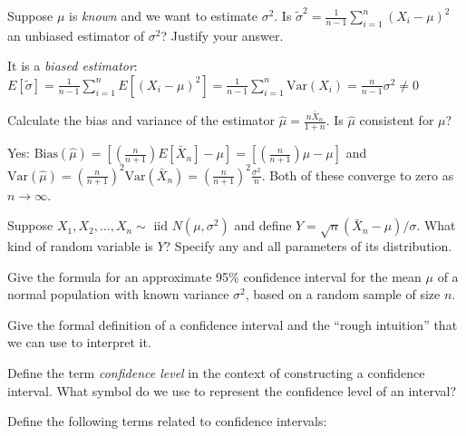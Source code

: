 \documentclass[addpoints,12pt]{exam}
\begin{document}
\begin{questions}
\question Suppose $\mu$ is \emph{known} and we want to estimate $\sigma^2$. Is $\widetilde{\sigma}^2 = \frac{1}{n-1}\sum_{i=1}^n (X_i - \mu)^2$ an unbiased estimator of $\sigma^2$?
Justify your answer.
\begin{solution}
  It is a \emph{biased estimator}: $E[\widetilde{\sigma}] = \frac{1}{n-1} \sum_{i=1}^n E[(X_i - \mu)^2] = \frac{1}{n-1} \sum_{i=1}^n \mbox{Var}(X_i) = \frac{n}{n-1} \sigma^2 \neq 0$
\end{solution}

\question Calculate the bias and variance of the estimator  $\widehat{\mu} = \displaystyle\frac{n \bar{X}_n}{1 + n}$.
Is $\widehat{\mu}$ consistent for $\mu$? 
\begin{solution}
  Yes: $\mbox{Bias}(\widehat{\mu}) = \left[ \left( \frac{n}{n+1} \right)E[\bar{X}_n] - \mu\right] = \left[ \left( \frac{n}{n+1} \right)\mu  - \mu\right]$ and $\mbox{Var}(\widehat{\mu}) = \left( \frac{n}{n+1} \right)^2 \mbox{Var}(\bar{X}_n) = \left( \frac{n}{n+1} \right)^2 \frac{\sigma^2}{n}$.
  Both of these converge to zero as $n \rightarrow \infty$.
\end{solution}


\question Suppose $X_1, X_2, \dots, X_n \sim \text{ iid } N(\mu, \sigma^2)$ and define $Y = \sqrt{n}(\bar{X}_n - \mu)/\sigma$. What kind of random variable is $Y$? Specify any and all parameters of its distribution.

\question Give the formula for an approximate 95\% confidence interval for the mean $\mu$ of a normal population with known variance $\sigma^2$, based on a random sample of size $n$.

\question Give the formal definition of a confidence interval and the ``rough intuition'' that we can use to interpret it.

\question Define the term \emph{confidence level} in the context of constructing a confidence interval. What symbol do we use to represent the confidence level of an interval?

\question Define the following terms related to confidence intervals:
\end{questions}
\end{document}
